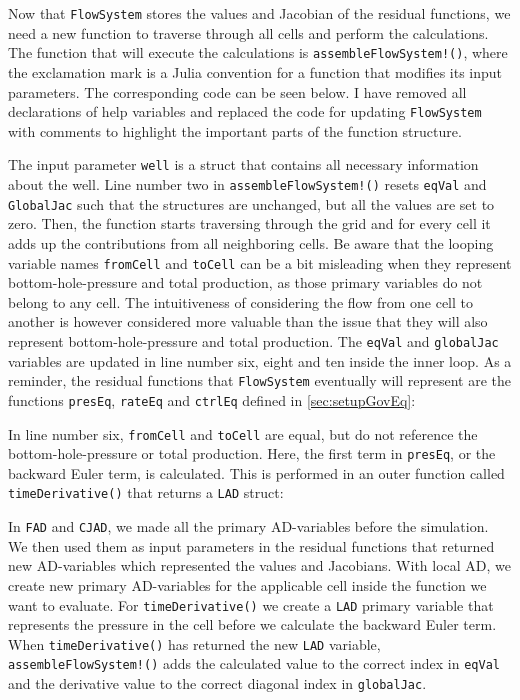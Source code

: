 Now that \texttt{FlowSystem} stores the  values and Jacobian of the residual functions, we need a new function to traverse through all cells and perform the calculations. The function that will execute the calculations is \texttt{assembleFlowSystem!()}, where the exclamation mark is a Julia convention for a function that modifies its input parameters. The corresponding code can be seen below. I have removed all declarations of help variables and replaced the code for updating \texttt{FlowSystem} with comments to highlight the important parts of the function structure.
\lstset{numbers=left}

\lstset{numbers=none}
The input parameter \texttt{well} is a struct that contains all necessary information about the well. Line number two in \texttt{assembleFlowSystem!()} resets \texttt{eqVal} and \texttt{GlobalJac} such that the structures are unchanged, but all the values are set to zero. Then, the function starts traversing through the grid and for every cell it adds up the contributions from all neighboring cells. Be aware that the looping variable names \texttt{fromCell} and \texttt{toCell} can be a bit misleading when they represent bottom-hole-pressure and total production, as those primary variables do not belong to any cell. The intuitiveness of considering the flow from one cell to another is however considered more valuable than the issue that they will also represent bottom-hole-pressure and total production. The \texttt{eqVal} and \texttt{globalJac} variables are updated in line number six, eight and ten inside the inner loop. As a reminder, the residual functions that \texttt{FlowSystem} eventually will represent are the functions \texttt{presEq}, \texttt{rateEq} and \texttt{ctrlEq} defined in \autoref{sec:setupGovEq}:

In line number six, \texttt{fromCell} and \texttt{toCell} are equal, but do not reference the bottom-hole-pressure or total production. Here, the first term in \texttt{presEq}, or the backward Euler term, is calculated. This is performed in an outer function called \texttt{timeDerivative()} that returns a \texttt{LAD} struct:

In \texttt{FAD} and \texttt{CJAD}, we made all the primary AD-variables before the simulation. We then used them as input parameters in the residual functions that returned new AD-variables which represented the values and Jacobians. With local AD, we create new primary AD-variables for the applicable cell inside the function we want to evaluate. For \texttt{timeDerivative()} we create a \texttt{LAD} primary variable that represents the pressure in the cell before we calculate the backward Euler term. When \texttt{timeDerivative()} has returned the new \texttt{LAD} variable, \texttt{assembleFlowSystem!()} adds the calculated value to the correct index in \texttt{eqVal} and the derivative value to the correct diagonal index in \texttt{globalJac}.

